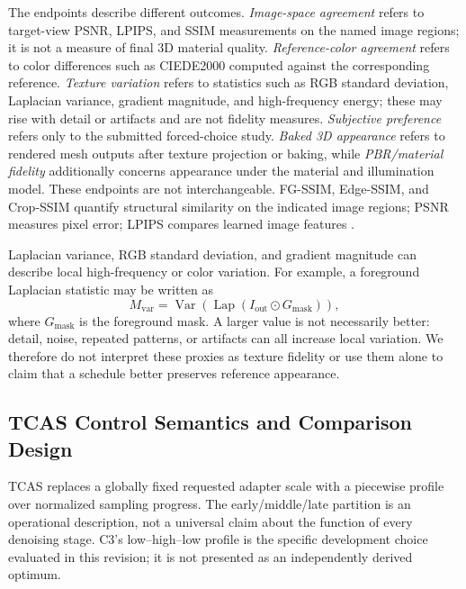 \documentclass[times,twocolumn,final]{elsarticle}
\begin{document}
The endpoints describe different outcomes. \emph{Image-space agreement} refers to target-view PSNR, LPIPS, and SSIM measurements on the named image regions; it is not a measure of final 3D material quality. \emph{Reference-color agreement} refers to color differences such as CIEDE2000 computed against the corresponding reference. \emph{Texture variation} refers to statistics such as RGB standard deviation, Laplacian variance, gradient magnitude, and high-frequency energy; these may rise with detail or artifacts and are not fidelity measures. \emph{Subjective preference} refers only to the submitted forced-choice study. \emph{Baked 3D appearance} refers to rendered mesh outputs after texture projection or baking, while \emph{PBR/material fidelity} additionally concerns appearance under the material and illumination model. These endpoints are not interchangeable. FG-SSIM, Edge-SSIM, and Crop-SSIM quantify structural similarity on the indicated image regions; PSNR measures pixel error; LPIPS compares learned image features \cite{wang2004ssim,zhang2018lpips}.

Laplacian variance, RGB standard deviation, and gradient magnitude can describe local high-frequency or color variation. For example, a foreground Laplacian statistic may be written as
\begin{equation}
M_{\mathrm{var}}=\operatorname{Var}\!\left(\operatorname{Lap}(I_{\mathrm{out}}\odot G_{\mathrm{mask}})\right),
\end{equation}
where $G_{\mathrm{mask}}$ is the foreground mask. A larger value is not necessarily better: detail, noise, repeated patterns, or artifacts can all increase local variation. We therefore do not interpret these proxies as texture fidelity or use them alone to claim that a schedule better preserves reference appearance.

\subsection{TCAS Control Semantics and Comparison Design}
\label{subsec:tcas}

TCAS replaces a globally fixed requested adapter scale with a piecewise profile over normalized sampling progress. The early/middle/late partition is an operational description, not a universal claim about the function of every denoising stage. C3's low--high--low profile is the specific development choice evaluated in this revision; it is not presented as an independently derived optimum.
\end{document}
